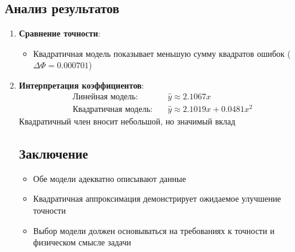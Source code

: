\subsection*{Анализ результатов}
\begin{enumerate}
\item \textbf{Сравнение точности}:
\begin{itemize}
\item Квадратичная модель показывает меньшую сумму квадратов ошибок ($\Delta\Phi = 0.000701$)
\end{itemize}

\item \textbf{Интерпретация коэффициентов}:
\begin{align*}
\text{Линейная модель:} &\quad \hat{y} \approx 2.1067x \\
\text{Квадратичная модель:} &\quad \hat{y} \approx 2.1019x + 0.0481x^2
\end{align*}
Квадратичный член вносит небольшой, но значимый вклад

\subsection*{Заключение}
\begin{itemize}
\item Обе модели адекватно описывают данные
\item Квадратичная аппроксимация демонстрирует ожидаемое улучшение точности
\item Выбор модели должен основываться на требованиях к точности и физическом смысле задачи
\end{itemize}
\end{enumerate}

\pagebreak
